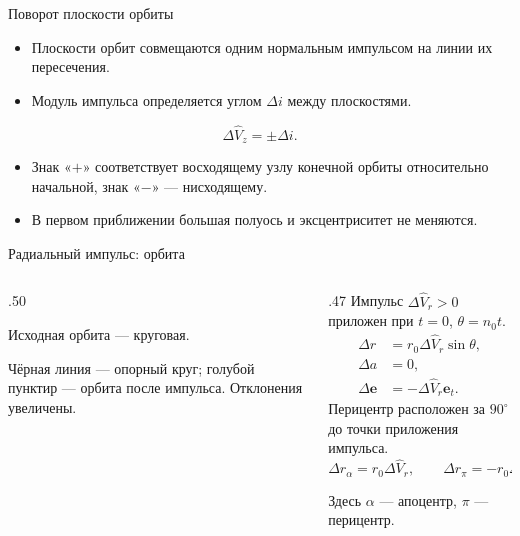 \documentclass[11pt,aspectratio=169,t]{beamer}
\newcommand{\eqcompact}{\fontsize{10}{12}\selectfont}
\newcommand{\figcaption}[1]{{\usebeamerfont{caption}\color{coursemuted}#1\par}}
\begin{document}
\begin{frame}{Поворот плоскости орбиты}
\relax
\begin{itemize}
 \setlength{\itemsep}{8pt}
 \item Плоскости орбит совмещаются одним нормальным импульсом на линии их пересечения.
 \item Модуль импульса определяется углом $\Delta i$ между плоскостями.
\end{itemize}
\medskip
\[
 \boxed{\Delta\widehat V_z=\pm\Delta i.}
\]
\medskip
\begin{itemize}
 \setlength{\itemsep}{8pt}
 \item Знак «$+$» соответствует восходящему узлу конечной орбиты относительно начальной, знак «$-$» — нисходящему.
 \item В первом приближении большая полуось и эксцентриситет не меняются.
\end{itemize}
\end{frame}

\begin{frame}{Радиальный импульс: орбита}
\relax
\begin{columns}[T,onlytextwidth]
\begin{column}{.50\textwidth}
{\justifying
Исходная орбита — круговая.\par}
\smallskip
\centering
\figcaption{Чёрная линия --- опорный круг; голубой пунктир --- орбита после импульса. Отклонения увеличены.}
\end{column}
\begin{column}{.47\textwidth}
Импульс $\Delta\widehat V_r>0$ приложен при $t=0$, $\theta=n_0t$.
{\eqcompact
\setlength{\abovedisplayskip}{3pt}\setlength{\belowdisplayskip}{3pt}
\setlength{\abovedisplayshortskip}{2pt}\setlength{\belowdisplayshortskip}{2pt}
\[
 \begin{aligned}
 \Delta r&=r_0{\Delta\widehat V_r}\sin\theta,\\
 \Delta a&=0,\\
 \Delta\boldsymbol e&=-{\Delta\widehat V_r}\boldsymbol e_t.
 \end{aligned}
\]
}
Перицентр расположен за $90^\circ$ до точки приложения импульса.
{\eqcompact
\setlength{\abovedisplayskip}{3pt}\setlength{\belowdisplayskip}{3pt}
\setlength{\abovedisplayshortskip}{2pt}\setlength{\belowdisplayshortskip}{2pt}
\[
 \Delta r_\alpha=r_0{\Delta\widehat V_r},\qquad \Delta r_\pi=-r_0{\Delta\widehat V_r}.
\]
}
{\justifying
Здесь $\alpha$ --- апоцентр, $\pi$ --- перицентр.\par}
\end{column}
\end{columns}
\end{frame}
\end{document}
